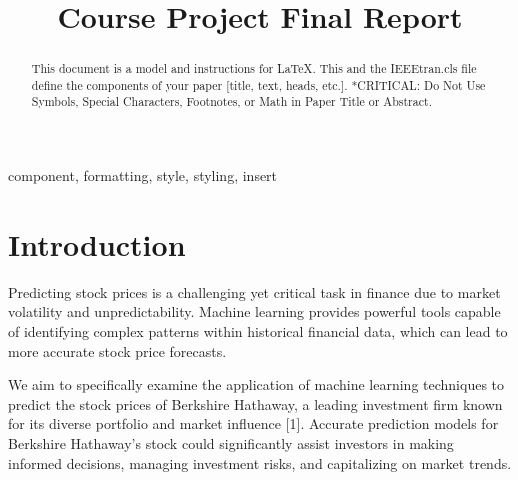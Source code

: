 \documentclass[conference]{IEEEtran}
\begin{document}
\title{Course Project Final Report\\

}

\author{
\and
{}
\and
{}
\and
{}
}

\maketitle

\begin{abstract}
This document is a model and instructions for \LaTeX.
This and the IEEEtran.cls file define the components of your paper [title, text, heads, etc.]. *CRITICAL: Do Not Use Symbols, Special Characters, Footnotes, 
or Math in Paper Title or Abstract.
\end{abstract}

\begin{IEEEkeywords}
component, formatting, style, styling, insert
\end{IEEEkeywords}

\section{Introduction}
Predicting stock prices is a challenging yet critical task in finance due to market volatility and unpredictability. Machine learning provides powerful tools capable of identifying complex patterns within historical financial data, which can lead to more accurate stock price forecasts.

We aim to specifically examine the application of machine learning techniques to predict the stock prices of Berkshire Hathaway, a leading investment firm known for its diverse portfolio and market influence [1]. Accurate prediction models for Berkshire Hathaway's stock could significantly assist investors in making informed decisions, managing investment risks, and capitalizing on market trends.
\end{document}
